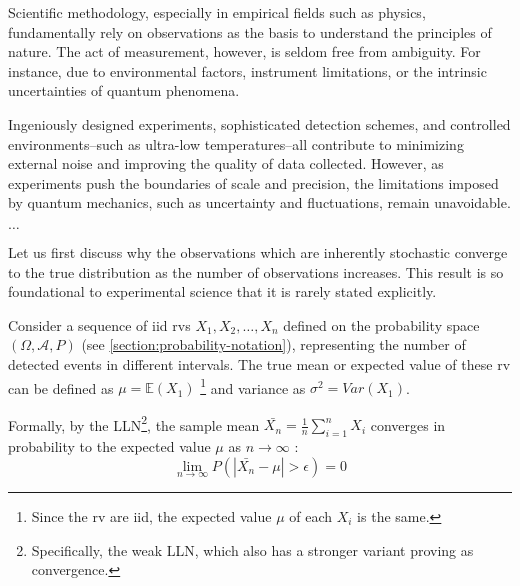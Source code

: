Scientific methodology, especially in empirical fields such as physics, fundamentally rely on observations as the basis to understand the principles of nature. The act of measurement, however, is seldom free from ambiguity. For instance, due to environmental factors, instrument limitations, or the intrinsic uncertainties of quantum phenomena. 

Ingeniously designed experiments, sophisticated detection schemes, and controlled environments--such as ultra-low temperatures--all contribute to minimizing external noise and improving the quality of data collected. However, as experiments push the boundaries of scale and precision, the limitations imposed by quantum mechanics, such as uncertainty and fluctuations, remain unavoidable.

$\dots$





Let us first discuss why the observations which are inherently stochastic converge to the true distribution as the number of observations increases. This result is so foundational to experimental science that it is rarely stated explicitly.

Consider a sequence of \gls{iid} \glspl{rv} $X_1, X_2, \dots, X_n$ defined on the probability space $(\Omega, \mathcal{A}, P)$ (see \cref{section:probability-notation}), representing the number of detected events in different intervals. The true mean or expected value of these \gls{rv} can be defined as $\mu = \mathbb{E}(X_1)$
\footnote{Since the \gls{rv} are \gls{iid}, the expected value $\mu$ of each $X_i$ is the same.} 
and variance as $\sigma^2 = Var(X_1)$.

Formally, by the \gls{LLN}\footnote{Specifically, the weak \gls{LLN}, which also has a stronger variant proving \gls{as} convergence.}, the sample mean $\bar{X_n} = \frac{1}{n} \sum_{i=1}^{n} X_i$ converges in probability to the expected value $\mu$ as $n \to \infty$ \cite{fellerIntroductionProbabilityTheory1968}:
\begin{equation}
    \lim_{n \to \infty} P(|\bar{X_n} - \mu| > \epsilon) = 0
\end{equation}

